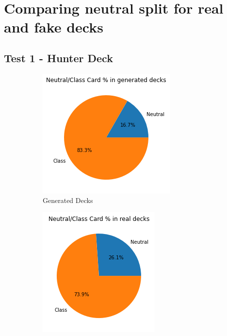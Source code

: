 \documentclass{report} %
\begin{document}
\section{Comparing neutral split for real and fake decks}
\subsection{Test 1 - Hunter Deck}
\begin{figure}[H]
\centering
\begin{subfigure}{.3\textwidth}
 \centering
 \includegraphics[width=.75\linewidth]{TestImages/NeutralSplitHunterDecks}
 \caption{Generated Decks}
\end{subfigure}%
\begin{subfigure}{.3\textwidth}
 \centering
 \includegraphics[width=.75\linewidth]{TestImages/NeutralSplitHunterDecksReal}

\end{subfigure}
\end{figure}
\end{document}
